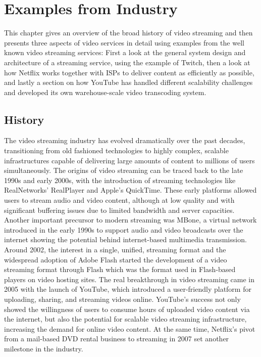 \chapter{Examples from Industry}\label{chapter:examples}

This chapter gives an overview of the broad history of video streaming and then presents three aspects of video services in detail using examples from the well known video streaming services: First a look at the general system design and architecture of a streaming service, using the example of Twitch, then a look at how Netflix works together with \ac{ISPs} to deliver content as efficiently as possible, and lastly a section on how YouTube has handled different scalability challenges and developed its own warehouse-scale video transcoding system.     

\section{History}
The video streaming industry has evolved dramatically over the past decades, transitioning from old fashioned technologies to highly complex, scalable infrastructures capable of delivering large amounts of content to millions of users simultaneously. The origins of video streaming can be traced back to the late 1990s and early 2000s, with the introduction of streaming technologies like RealNetworks' RealPlayer and Apple's QuickTime. These early platforms allowed users to stream audio and video content, although at low quality and with significant buffering issues due to limited bandwidth and server capacities.
Another important precursor to modern streaming was \ac{MBone}, a virtual network introduced in the early 1990s to support audio and video broadcasts over the internet showing the potential behind internet-based multimedia transmission. 
Around 2002, the interest in a single, unified, streaming format and the widespread adoption of Adobe Flash started the development of a video streaming format through Flash which was the format used in Flash-based players on video hosting sites.
The real breakthrough in video streaming came in 2005 with the launch of YouTube, which introduced a user-friendly platform for uploading, sharing, and streaming videos online. YouTube's success not only showed the willingness of users to consume hours of uploaded video content via the internet, but also the potential for scalable video streaming infrastructure, increasing the demand for online video content. At the same time, Netflix's pivot from a mail-based DVD rental business to streaming in 2007 set another milestone in the industry. 

